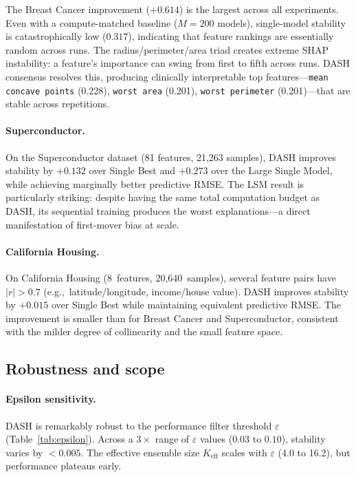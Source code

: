 \documentclass[11pt]{article}
\newcommand{\dash}{\textsc{DASH}}
\newcommand{\eg}{e.g.,\ }
\begin{document}
The Breast Cancer improvement ($+0.614$) is the largest across all
experiments. Even with a compute-matched baseline ($M{=}200$ models),
single-model stability is catastrophically low ($0.317$), indicating
that feature rankings are essentially random across runs. The
radius/perimeter/area triad creates extreme SHAP instability: a
feature's importance can swing from first to fifth across runs. \dash{}
consensus resolves this, producing clinically interpretable top
features---\texttt{mean concave points}
(0.228), \texttt{worst area} (0.201), \texttt{worst perimeter}
(0.201)---that are stable across repetitions.

\paragraph{Superconductor.}
On the Superconductor dataset (81 features, 21,263 samples), \dash{}
improves stability by $+0.132$ over Single Best and $+0.273$ over the
Large Single Model, while achieving marginally better predictive RMSE.
The LSM result is particularly striking: despite having the same total
computation budget as \dash{}, its sequential training produces the
worst explanations---a direct manifestation of first-mover bias at scale.

\paragraph{California Housing.}
On California Housing (8~features, 20,640~samples), several feature
pairs have $|r| > 0.7$ (\eg latitude/longitude, income/house value).
\dash{} improves stability by $+0.015$ over Single Best while
maintaining equivalent predictive RMSE. The improvement is smaller than
for Breast Cancer and Superconductor, consistent with the milder degree
of collinearity and the small feature space.

\subsection{Robustness and scope}
\label{sec:robustness}

\paragraph{Epsilon sensitivity.}
\dash{} is remarkably robust to the performance filter threshold
$\varepsilon$ (Table~\ref{tab:epsilon}). Across a $3\times$ range of
$\varepsilon$ values ($0.03$ to $0.10$), stability varies by $< 0.005$.
The effective ensemble size $K_{\text{eff}}$ scales with $\varepsilon$
(4.0 to 16.2), but performance plateaus early.
\end{document}
